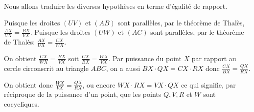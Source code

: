 \begin{sol}
\begin{center}
\end{center}

Nous allons traduire les diverses hypothèses en terme d'égalité de rapport. 

Puisque les droites $(UV)$ et $(AB)$ sont parallèles, par le théorème de Thalès, $\frac{AX}{UX}=\frac{BX}{VX}$.
Puisque les droites $(UW)$ et $(AC)$ sont parallèles, par le théorème de Thalès: $\frac{AX}{UX}=\frac{CX}{WX}$.

On obtient $\frac{CX}{WX}=\frac{BX}{VX}$ soit $\frac{CX}{BX}=\frac{WX}{VX}$. Par puissance du point $X$ par rapport au cercle circonscrit au triangle $ABC$, on a aussi $BX\cdot QX=CX\cdot RX$ donc $\frac{CX}{BX}=\frac{QX}{RX}$. 

On obtient donc $\frac{WX}{VX}=\frac{QX}{RX}$, ou encore $WX\cdot RX=VX\cdot QX$ ce qui signifie, par réciproque de la puissance d'un point, que les points $Q,V,R$ et $W$ sont cocycliques.  

\end{sol}
